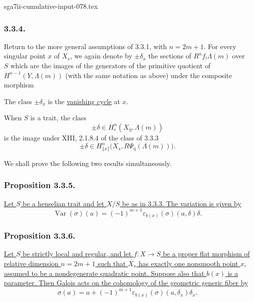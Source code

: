 \begin{filecontents*}{sga7ii-cumulative-input-078.tex}
\subsubsection*{3.3.4.}
Return to the more general assumptions of 3.3.1, with $n=2m+1$.
For every singular point $x$ of $X_s$, we again denote by
$\pm\delta_x$ the sections of $R^nf_!\Lambda(m)$ over $S$ which are
the images of the generators of the primitive quotient of
$H^{n-1}(Y,\Lambda(m))$ (with the same notation as above) under the
composite morphism
\begin{center}
\end{center}
The class $\pm\delta_x$ is the \underline{vanishing cycle} at $x$.

When $S$ is a trait, the class
\[
\pm\delta\in H_c^n(X_{\bar\eta},\Lambda(m))
\]
is the image under XIII, 2.1.8.4 of the class of 3.3.3
\[
\pm\delta\in
H^n_{\{x\}}\bigl(X_s,R\Psi_{\bar\eta}(\Lambda(m))\bigr).
\]

We shall prove the following two results simultaneously.

\subsubsection*{Proposition 3.3.5.}
\underline{Let $S$ be a henselian trait and let $X/S$ be as in
3.3.3.  The variation is given by}
\[
\operatorname{Var}(\sigma)(a)
=(-1)^{m+1}\varepsilon_{b(x)}(\sigma)(a,\delta)\delta.
\]

\subsubsection*{Proposition 3.3.6.}
\underline{Let $S$ be strictly local and regular, and let
$f:X\to S$ be a proper flat morphism of relative dimension
$n=2m+1$ such that $X_s$ has exactly one nonsmooth point $x$, assumed
to be a nondegenerate quadratic point.  Suppose also that $b(x)$ is
a parameter.  Then Galois acts on the cohomology of the geometric
generic fiber by}
\[
\sigma(a)=a+(-1)^{m+1}
\varepsilon_{b(x)}(\sigma)(a,\delta_x)\delta_x.
\]
\end{filecontents*}
